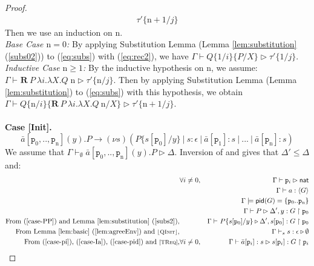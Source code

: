 \documentclass{LMCS}
\newcommand{\ptilde}[1]{{\ensuremath{#1}}}
\newcommand{\kf}[1]{\textup{\textsf{#1}}\xspace}
\newcommand{\sr}[4]{\ensuremath{\bar{#1}[#2](#3).#4}}
\newcommand{\pp}{\ensuremath{\at{\p}}}
\newcommand{\si}[2]{\ensuremath{#1[#2]}}
\newcommand{\sj}[3]{\ensuremath{\bar{#1}[#2]:#3}}
\newcommand{\participant}[1]{\ensuremath{\mathtt{#1}}}
\newcommand{\p}{\ensuremath{\participant{p}}}
\newcommand{\pc}{\Par}
\newcommand{\s}{\ensuremath{s}}
\newcommand{\at}[1]{\ensuremath{\ptilde{#1}}}
\newcommand{\Par}{\ensuremath{\ |\ }}
\newcommand{\RECSEQP}[4]{\ensuremath{\mathbf{R} \ #1\ \lambda #2.\lambda #3.#4}}
\newcommand{\redsym}{\ensuremath{\longrightarrow}}
\newcommand{\sub}[2]{\ensuremath{\{#1/#2\}}}
\newcommand{\qbot}{\ensuremath{\epsilon}}
\newcommand{\G}{\ensuremath{G}}
\newcommand{\Ga}{\ensuremath{\Gamma}}
\newcommand{\D}{\ensuremath{\Delta}}
\newcommand{\Nat}{\kf{nat}}
\newcommand{\trule}[1]{\text{\footnotesize{\ensuremath{\lfloor\text{\sc{#1}}\rfloor}}}}
\newcommand{\tftrule}[1]{{\text{\footnotesize[\text{\sc{#1}}]}}}
\newcommand{\derqq}[4]{\ensuremath{#1 \vdash_{#2} #3 \triangleright #4}}
\newcommand{\GR}[4]{\RECSEQP{#1}{#2}{#3}{#4}}
\newcommand{\APP}{\;}
\newcommand{\mar}[1]{\ensuremath{\langle #1 \rangle}}
\newcommand{\pid}{\kf{pid}}
\newcommand{\y}{\ensuremath{y}}
\newcommand{\Ia}{\ensuremath{a}}
\newcommand{\ii}{\ensuremath{i}}
\newcommand{\jj}{\ensuremath{j}}
\newcommand{\n}{\ensuremath{\mathrm{n}}}
\newcommand{\PP}{\ensuremath{P}}
\newcommand{\QQ}{\ensuremath{Q}}
\newcommand{\Ty}{\ensuremath{\tau}}
\newcommand{\proj}[1]{\ensuremath{\upharpoonright #1}}
\newcommand{\proves}{\vdash}                        \newcommand{\judg}{{J}}
\begin{document}
\begin{proof}
\begin{eqnarray}
  \Ty'\sub{\n+1}{\jj} 
\end{eqnarray}
Then we use an induction on $\n$. \\[1mm]
{\em Base Case $\n=0$:} 
By applying Substitution Lemma (Lemma \ref{lem:substitution}
(\ref{subs02})) to  (\ref{eq:subs}) with (\ref{eq:rec2}), we have 
$\Gamma  \vdash \QQ\sub{1}{\ii}\sub{P}{X}  \rhd
  \Ty'\sub{1}{\jj}$.  \\[1mm]
{\em Inductive Case $\n\geq 1$:} 
By the inductive hypothesis on $\n$, 
we assume: 
$\derqq\Ga{}{\GR{P}{\ii}{X}{Q}\APP \n}{\Ty'\sub{\n}{\jj}}$. 
Then by applying Substitution Lemma (Lemma \ref{lem:substitution}) to
(\ref{eq:subs}) with this hypothesis, 
we obtain
$\Gamma\vdash \QQ\sub{\n}{\ii}\sub{\GR{P}{\ii}{X}{Q}\ \n}{X}  \rhd
 \Ty'\sub{\n+1}{\jj}$. \\[1mm]
\\[1mm]
{\bf Case [Init].}
$$
\sr\Ia{\p_0,..,\p_\n}{\y}{\PP}\redsym (\nu \s)(
        \PP\sub{\si\s {\p_0}}{\y} \pc s : \qbot \pc \sj{\Ia}{\p_1}{\s} \pc ...\pc
        \sj{\Ia}{\p_\n}{\s})
$$
We assume that
$\derqq{\Ga}{\emptyset}{\sr\Ia{\p_0,..,\p_\n}{\y}{\PP}}{\D}$. Inversion of
\tftrule{TInit} and \tftrule{TSub} gives that $\D'\leq\D$ and:
{\small
\begin{eqnarray}
& \forall i\neq 0, & \Gamma \proves \p_i\rhd \Nat\label{case-pi}\\
& & \Gamma \vdash \Ia:\mar{\G} \label{case-Ia}\\
& & \Gamma \models \pid(\G)=\{\p_0..\p_\n\} \label{case-pid}\\
& & \Gamma \vdash \PP \rhd \D', \y:\G \proj{\p_0} \label{case-PP}\\
\text{From~(\ref{case-PP}) and Lemma~\ref{lem:substitution}~(\ref{subs2}),}
& & \derqq{\Ga}{}{\PP\sub{\si\s {\p_0}}{\y}}{\D', \si\s {\p_0}:\G \proj{\p_0}} \label{case-sub}\\
\text{\hspace{-3ex}From Lemma~\ref{lem:basic}~(\ref{lem:agreeEnv}) and \trule{QInit},}
& & \derqq{\Ga}{s}{s : \qbot}{\emptyset} \label{case-sbot}\\
\text{From (\ref{case-pi}), (\ref{case-Ia}), (\ref{case-pid}) and
  \tftrule{TReq},}
& \forall i\neq 0, & \Gamma \vdash \sj{\Ia}{\pp_i}{\s} \rhd \s[\pp_i]:\G \proj{\pp_i} \label{case-sppi}
\end{eqnarray}
}




\end{proof}
\end{document}
